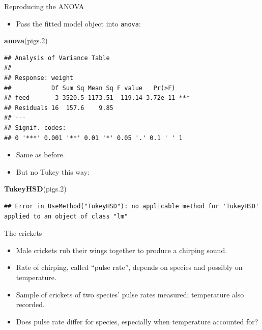 \documentclass[ignorenonframetext,]{beamer}
\newenvironment{Shaded}{\begin{snugshade}}{\end{snugshade}}
\newcommand{\FloatTok}[1]{\textcolor[rgb]{0.00,0.00,0.81}{#1}}
\newcommand{\KeywordTok}[1]{\textcolor[rgb]{0.13,0.29,0.53}{\textbf{#1}}}
\newcommand{\NormalTok}[1]{#1}
\providecommand{\tightlist}{%
  \setlength{\itemsep}{0pt}\setlength{\parskip}{0pt}}
\begin{document}
\begin{frame}[fragile]{Reproducing the ANOVA}
\protect\hypertarget{reproducing-the-anova}{}

\begin{itemize}
\tightlist
\item
  Pass the fitted model object into \texttt{anova}:
\end{itemize}

\footnotesize

\begin{Shaded}
\begin{Highlighting}[]
\KeywordTok{anova}\NormalTok{(pigs}\FloatTok{.2}\NormalTok{)}
\end{Highlighting}
\end{Shaded}

\begin{verbatim}
## Analysis of Variance Table
## 
## Response: weight
##           Df Sum Sq Mean Sq F value   Pr(>F)    
## feed       3 3520.5 1173.51  119.14 3.72e-11 ***
## Residuals 16  157.6    9.85                     
## ---
## Signif. codes:  
## 0 '***' 0.001 '**' 0.01 '*' 0.05 '.' 0.1 ' ' 1
\end{verbatim}

\normalsize

\begin{itemize}
\tightlist
\item
  Same as before.
\item
  But no Tukey this way:
\end{itemize}

\footnotesize

\begin{Shaded}
\begin{Highlighting}[]
\KeywordTok{TukeyHSD}\NormalTok{(pigs}\FloatTok{.2}\NormalTok{)}
\end{Highlighting}
\end{Shaded}

\begin{verbatim}
## Error in UseMethod("TukeyHSD"): no applicable method for 'TukeyHSD' applied to an object of class "lm"
\end{verbatim}

\normalsize

\end{frame}

\begin{frame}{The crickets}
\protect\hypertarget{the-crickets}{}

\begin{itemize}
\tightlist
\item
  Male crickets rub their wings together to produce a chirping sound.
\item
  Rate of chirping, called ``pulse rate'', depends on species and
  possibly on temperature.
\item
  Sample of crickets of two species' pulse rates measured; temperature
  also recorded.
\item
  Does pulse rate differ for species, especially when temperature
  accounted for?
\end{itemize}

\end{frame}
\end{document}

